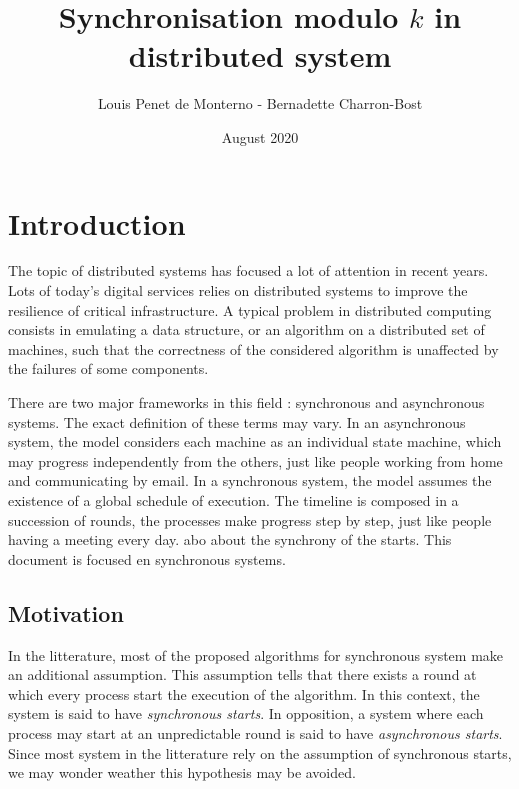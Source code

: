 \documentclass{article}
\title{Synchronisation modulo $k$ in distributed system}
\date{August 2020}
\author{Louis Penet de Monterno - Bernadette Charron-Bost}
\begin{document}
\maketitle

\section{Introduction}

The topic of distributed systems has focused a lot of attention in recent years.
Lots of today's digital services relies on distributed systems to improve the resilience of critical infrastructure.
A typical problem in distributed computing consists in emulating a data structure, or an algorithm on a distributed
set of machines, such that the correctness of the considered algorithm is unaffected by the failures of some components.

There are two major frameworks in this field : synchronous and asynchronous systems. The exact definition of these terms may vary.
In an asynchronous system, the model considers each machine as an individual state machine, which may progress independently from the others,
just like people working from home and communicating by email.
In a synchronous system, the model assumes the existence of a global schedule of execution.
The timeline is composed in a succession of rounds, the processes make progress step by step,
just like people having a meeting every day. abo about the synchrony of the starts.
This document is focused en synchronous systems.


\subsection{Motivation}

In the litterature, most of the proposed algorithms for synchronous system make an additional assumption.
This assumption tells that there exists a round at which every process start the execution of the algorithm.
In this context, the system is said to have \emph{synchronous starts}.
In opposition, a system where each process may start at an unpredictable round is said to have \emph{asynchronous starts}.
Since most system in the litterature rely on the assumption of synchronous starts, we may wonder weather this hypothesis may be avoided.
\end{document}
